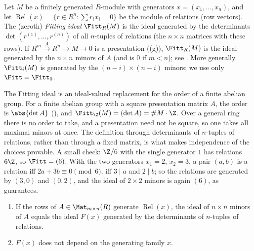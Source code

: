 \begin{definition}\label{def:modules:fitting}
Let $M$ be a finitely generated $R$-module with generators $x=(x_1,\dots,x_n)$, and let $\operatorname{Rel}(x)=\{r\in R^n:\sum r_ix_i=0\}$ be the module of
relations (row vectors). The (zeroth) \emph{Fitting ideal} $\Fitt_R(M)$ is the ideal generated by the determinants $\det(r^{(1)},\dots,r^{(n)})$ of all
$n$-tuples of relations (the $n\times n$ matrices with these rows). If $R^m\xrightarrow{A}R^n\to M\to0$ is a presentation ((g)),
$\Fitt_R(M)$ is the ideal generated by the $n\times n$ minors of $A$ (and is $0$ if $m<n$); see . More generally
$\Fitt_i(M)$ is generated by the $(n-i)\times(n-i)$ minors; we use only $\Fitt=\Fitt_0$.
\end{definition}

The Fitting ideal is an ideal-valued replacement for the order of a finite abelian group. For a finite abelian group with a square
presentation matrix $A$, the order is $\abs{\det A}$ (), and $\Fitt_\Z(M)=(\det A)=\#M\cdot\Z$. Over a general
ring there is no order to take, and a presentation need not be square, so one takes all maximal minors at once. The definition through
determinants of $n$-tuples of relations, rather than through a fixed matrix, is what makes independence of the choices provable.
A small check: $\Z/6$ with the single generator $1$ has relations $6\Z$, so $\Fitt=(6)$. With the two generators $x_1=2$, $x_2=3$, a pair
$(a,b)$ is a relation iff $2a+3b\equiv0\pmod6$, iff $3\mid a$ and $2\mid b$; so the relations are generated by $(3,0)$ and $(0,2)$, and the
ideal of $2\times2$ minors is again $(6)$, as  guarantees.

\begin{lemma}\label{lem:modules:fitting-well-defined}
\begin{enumerate}[label=(\roman*)]
\item If the rows of $A\in\Mat_{m\times n}(R)$ generate $\operatorname{Rel}(x)$, the ideal of $n\times n$ minors of $A$ equals the ideal $F(x)$ generated by the
determinants of $n$-tuples of relations.
\item $F(x)$ does not depend on the generating family $x$.
\end{enumerate}
\end{lemma}

